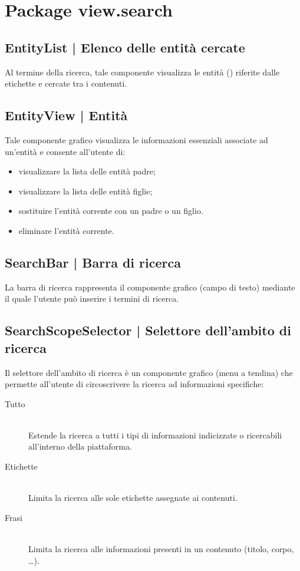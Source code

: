 \documentclass[10pt,a4paper,headinclude,footinclude,hidelinks]{scrreprt} %
\begin{document}
	\section{Package view.search}
	\label{sec:stage:design:sistema:view.search}

	\subsection[EntityList]{EntityList | Elenco delle entità cercate}
	\label{sec:stage:design:sistema:view.search:search-entity-list}
	Al termine della ricerca, tale componente visualizza le entità (\textit{}) riferite dalle etichette e cercate tra i contenuti.

	\subsection[EntityView]{EntityView | Entità}
	\label{sec:stage:design:sistema:view.search:entity}
	Tale componente grafico visualizza le informazioni essenziali associate ad un'entità e consente all'utente di:
	\begin{itemize}
	\item visualizzare la lista delle entità padre;
	\item visualizzare la lista delle entità figlie;
	\item sostituire l'entità corrente con un padre o un figlio.
	\item eliminare l'entità corrente.
	\end{itemize}

	\subsection[SearchBar]{SearchBar | Barra di ricerca}
	\label{sec:stage:design:sistema:view.search:search-bar}
	La barra di ricerca rappresenta il componente grafico (campo di testo) mediante il quale l'utente può inserire i termini di ricerca.

	\subsection[SearchScopeSelector]{SearchScopeSelector | Selettore dell'ambito di ricerca}
	\label{sec:stage:design:sistema:view.search:search-scope-selector}
	Il selettore dell'ambito di ricerca è un componente grafico (menu a tendina) che permette all'utente di circoscrivere la ricerca ad informazioni specifiche:
	\begin{description}
	\item[Tutto] \hfill \\
	Estende la ricerca a tutti i tipi di informazioni indicizzate o ricercabili all'interno della piattaforma.
 	\item[Etichette] \hfill \\
	Limita la ricerca alle sole etichette assegnate ai contenuti.
	\item[Frasi] \hfill \\
	Limita la ricerca alle informazioni presenti in un contenuto (titolo, corpo, \ldots).
	\end{description}
\end{document}
